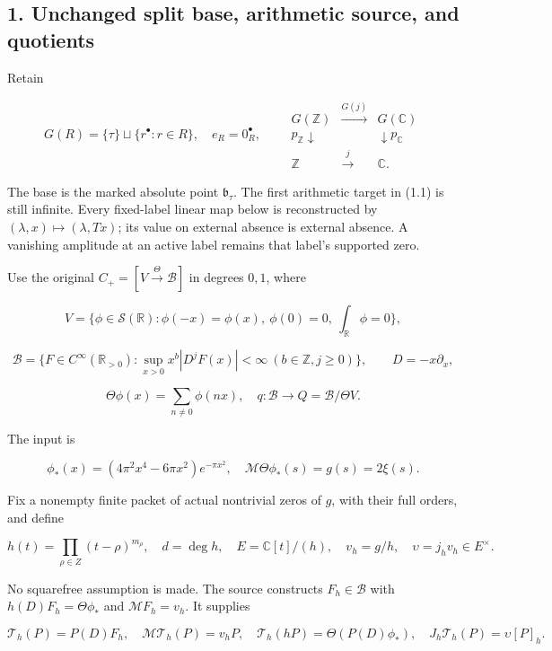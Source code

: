 \documentclass[
]{article}
\begin{document}
\subsection{1. Unchanged split base, arithmetic source, and
quotients}\label{unchanged-split-base-arithmetic-source-and-quotients}

Retain

\[G(R)=\{\tau\}\sqcup\{r^\bullet:r\in R\},\quad e_R=0_R^\bullet,\qquad
\begin{array}{ccc}
G(\mathbb Z)&\xrightarrow{G(j)}&G(\mathbb C)\\
p_{\mathbb Z}\downarrow&&\downarrow p_{\mathbb C}\\
\mathbb Z&\xrightarrow{j}&\mathbb C.
\end{array}\tag{1.1}\]

The base is the marked absolute point \(\mathfrak b_\tau\). The first
arithmetic target in (1.1) is still infinite. Every fixed-label linear
map below is reconstructed by \((\lambda,x)\mapsto(\lambda,Tx)\); its
value on external absence is external absence. A vanishing amplitude at
an active label remains that label's supported zero.

Use the original \(C_+=[V\xrightarrow\Theta\mathscr B]\) in degrees
\(0,1\), where

\[V=\{\phi\in\mathcal S(\mathbb R):\phi(-x)=\phi(x),\ \phi(0)=0,\ \int_{\mathbb R}\phi=0\},\]

\[\mathscr B=\{F\in C^\infty(\mathbb R_{>0}):\sup_{x>0}x^b|D^jF(x)|<\infty\ (b\in\mathbb Z,j\ge0)\},\qquad D=-x\partial_x,\]

\[\Theta\phi(x)=\sum_{n\ne0}\phi(nx),\quad q:\mathscr B\to Q=\mathscr B/\Theta V.\]

The input is

\[\phi_*(x)=(4\pi^2x^4-6\pi x^2)e^{-\pi x^2},\quad
\mathcal M\Theta\phi_*(s)=g(s)=2\xi(s).\]

Fix a nonempty finite packet of actual nontrivial zeros of \(g\), with
their full orders, and define

\[h(t)=\prod_{\rho\in Z}(t-\rho)^{m_\rho},\quad d=\deg h,\quad E=\mathbb C[t]/(h),\quad
v_h=g/h,\quad \upsilon=j_hv_h\in E^\times.\tag{1.2}\]

No squarefree assumption is made. The source constructs
\(F_h\in\mathscr B\) with \(h(D)F_h=\Theta\phi_*\) and
\(\mathcal MF_h=v_h\). It supplies

\[\mathcal T_h(P)=P(D)F_h,\quad
\mathcal M\mathcal T_h(P)=v_hP,\quad
\mathcal T_h(hP)=\Theta(P(D)\phi_*),\quad J_h\mathcal T_h(P)=\upsilon[P]_h.\tag{1.3}\]
\end{document}
